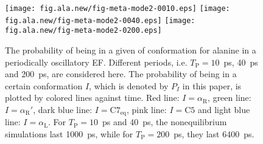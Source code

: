 \documentclass[a4paper,preprint,unsortedaddress,onecolumn]{revtex4-1}
\newcommand{\period}[0]{T_{\textrm{P}}}
\newcommand{\confaa}[0]{{\alpha_{\textrm{R}}}}
\newcommand{\confab}[0]{{\alpha_{\textrm{R}}'}}
\newcommand{\confba}[0]{{\textrm{C}7_{\textrm{eq}}}}
\newcommand{\confbb}[0]{{\textrm{C}5}}
\newcommand{\confc}[0]{{\alpha_{\textrm{L}}}}
\begin{document}
\begin{figure}
  \centering
  \texttt{[image: fig.ala.new/fig-meta-mode2-0010.eps]}
  \texttt{[image: fig.ala.new/fig-meta-mode2-0040.eps]}
  \texttt{[image: fig.ala.new/fig-meta-mode2-0200.eps]}
  \caption{The probability of being in a given of conformation for alanine in a   periodically oscillatory EF. Different periods,
    i.e. $\period =10$~ps, 40~ps and 200~ps, are considered here.  The
    probability of being in a certain conformation $I$, which is
    denoted by $P_I$ in this paper, is plotted by colored lines against
    time. Red line: $I = \confaa$,  green line: $I = \confab$,  dark
    blue line: $I = \confba$,  pink line: $I = \confbb$ and  light blue
    line: $I = \confc$. For $\period =10$~ps and 40~ps, the nonequilibrium
    simulations last 1000~ps, while for $\period =200$~ps,
    they last 6400~ps.  }
  \label{fig:tmp9}
\end{figure}
\end{document}
